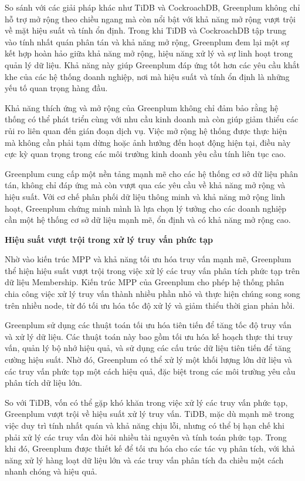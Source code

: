 \documentclass[14pt]{article}
\begin{document}
So sánh với các giải pháp khác như TiDB và CockroachDB, Greenplum không chỉ hỗ trợ mở rộng theo chiều ngang mà còn nổi bật với khả năng mở rộng vượt trội về mặt hiệu suất và tính ổn định. Trong khi TiDB và CockroachDB tập trung vào tính nhất quán phân tán và khả năng mở rộng, Greenplum đem lại một sự kết hợp hoàn hảo giữa khả năng mở rộng, hiệu năng xử lý và sự linh hoạt trong quản lý dữ liệu. Khả năng này giúp Greenplum đáp ứng tốt hơn các yêu cầu khắt khe của các hệ thống doanh nghiệp, nơi mà hiệu suất và tính ổn định là những yếu tố quan trọng hàng đầu.

Khả năng thích ứng và mở rộng của Greenplum không chỉ đảm bảo rằng hệ thống có thể phát triển cùng với nhu cầu kinh doanh mà còn giúp giảm thiểu các rủi ro liên quan đến gián đoạn dịch vụ. Việc mở rộng hệ thống được thực hiện mà không cần phải tạm dừng hoặc ảnh hưởng đến hoạt động hiện tại, điều này cực kỳ quan trọng trong các môi trường kinh doanh yêu cầu tính liên tục cao.

Greenplum cung cấp một nền tảng mạnh mẽ cho các hệ thống cơ sở dữ liệu phân tán, không chỉ đáp ứng mà còn vượt qua các yêu cầu về khả năng mở rộng và hiệu suất. Với cơ chế phân phối dữ liệu thông minh và khả năng mở rộng linh hoạt, Greenplum chứng minh mình là lựa chọn lý tưởng cho các doanh nghiệp cần một hệ thống cơ sở dữ liệu mạnh mẽ, ổn định và có khả năng mở rộng cao.



\textbf{Hiệu suất vượt trội trong xử lý truy vấn phức tạp}

Nhờ vào kiến trúc MPP và khả năng tối ưu hóa truy vấn mạnh mẽ, Greenplum thể hiện hiệu suất vượt trội trong việc xử lý các truy vấn phân tích phức tạp trên dữ liệu Membership. Kiến trúc MPP của Greenplum cho phép hệ thống phân chia công việc xử lý truy vấn thành nhiều phần nhỏ và thực hiện chúng song song trên nhiều node, từ đó tối ưu hóa tốc độ xử lý và giảm thiểu thời gian phản hồi.

Greenplum sử dụng các thuật toán tối ưu hóa tiên tiến để tăng tốc độ truy vấn và xử lý dữ liệu. Các thuật toán này bao gồm tối ưu hóa kế hoạch thực thi truy vấn, quản lý bộ nhớ hiệu quả, và sử dụng các cấu trúc dữ liệu tiên tiến để tăng cường hiệu suất. Nhờ đó, Greenplum có thể xử lý một khối lượng lớn dữ liệu và các truy vấn phức tạp một cách hiệu quả, đặc biệt trong các môi trường yêu cầu phân tích dữ liệu lớn.

So với TiDB, vốn có thể gặp khó khăn trong việc xử lý các truy vấn phức tạp, Greenplum vượt trội về hiệu suất xử lý truy vấn. TiDB, mặc dù mạnh mẽ trong việc duy trì tính nhất quán và khả năng chịu lỗi, nhưng có thể bị hạn chế khi phải xử lý các truy vấn đòi hỏi nhiều tài nguyên và tính toán phức tạp. Trong khi đó, Greenplum được thiết kế để tối ưu hóa cho các tác vụ phân tích, với khả năng xử lý hàng loạt dữ liệu lớn và các truy vấn phân tích đa chiều một cách nhanh chóng và hiệu quả.
\end{document}
